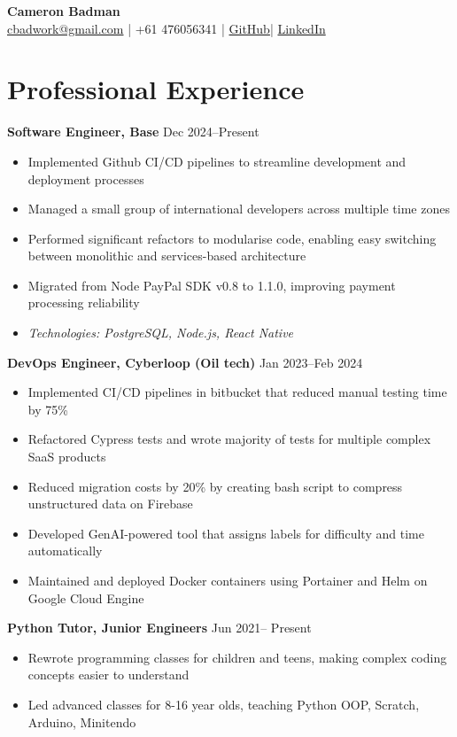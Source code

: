 \documentclass[10pt,a4paper]{article}
\begin{document}
	\begin{center}
		{\huge\textbf{Cameron Badman}} \\[0.5em]
		\href{mailto:cbadwork@gmail.com}{cbadwork@gmail.com} |
		+61 476056341 |
		\href{https://github.com/CameronBadman}{GitHub}| 
		\href{https://www.linkedin.com/in/cameron-badman-5314ba1b8/}{LinkedIn}
	\end{center}
	
	\section{Professional Experience}
	\textbf{Software Engineer, Base} \hfill Dec 2024--Present 
	\begin{itemize}[label=\textbullet, itemsep=0.02cm]
		\item Implemented Github CI/CD pipelines to streamline development and deployment processes
		\item Managed a small group of international developers across multiple time zones
		\item Performed significant refactors to modularise code, enabling easy switching between monolithic and services-based architecture
		\item Migrated from Node PayPal SDK v0.8 to 1.1.0, improving payment processing reliability
		\item \textit{Technologies: PostgreSQL, Node.js, React Native}
	\end{itemize}
	
	\textbf{DevOps Engineer, Cyberloop (Oil tech)} \hfill Jan 2023--Feb 2024 
	\begin{itemize}[label=\textbullet, itemsep=0.02cm]
		\item Implemented CI/CD pipelines in bitbucket that reduced manual testing time by 75\%
		\item Refactored Cypress tests and wrote majority of tests for multiple complex SaaS products
		\item Reduced migration costs by 20\% by creating bash script to compress unstructured data on Firebase
		\item Developed GenAI-powered tool that assigns labels for difficulty and time automatically
		\item Maintained and deployed Docker containers using Portainer and Helm on Google Cloud Engine
	\end{itemize}
	
	\textbf{Python Tutor, Junior Engineers} \hfill Jun 2021-- Present 
	\begin{itemize}[label=\textbullet, itemsep=0.02cm]
		\item Rewrote programming classes for children and teens, making complex coding concepts easier to understand
		\item Led advanced classes for 8-16 year olds, teaching Python OOP, Scratch, Arduino, Minitendo
	\end{itemize}
	
\end{document}
